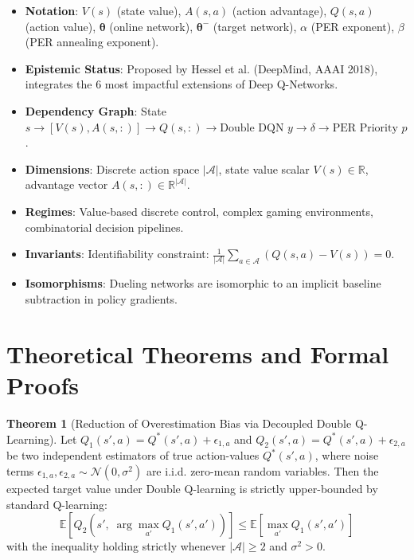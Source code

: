 \documentclass[11pt,a4paper]{article}
\theoremstyle{definition}
\newtheorem{theorem}{\textbf{Theorem}}[section]
\begin{document}
\begin{itemize}
    \item \textbf{Notation}: $V(s)$ (state value), $A(s, a)$ (action advantage), $Q(s, a)$ (action value), $\boldsymbol{\theta}$ (online network), $\boldsymbol{\theta}^-$ (target network), $\alpha$ (PER exponent), $\beta$ (PER annealing exponent).
    \item \textbf{Epistemic Status}: Proposed by Hessel et al. (DeepMind, AAAI 2018), integrates the 6 most impactful extensions of Deep Q-Networks.
    \item \textbf{Dependency Graph}: State $s \to [V(s), A(s, :)] \to Q(s, :) \to \text{Double DQN } y \to \delta \to \text{PER Priority } p$.
    \item \textbf{Dimensions}: Discrete action space $|\mathcal{A}|$, state value scalar $V(s) \in \mathbb{R}$, advantage vector $A(s, :) \in \mathbb{R}^{|\mathcal{A}|}$.
    \item \textbf{Regimes}: Value-based discrete control, complex gaming environments, combinatorial decision pipelines.
    \item \textbf{Invariants}: Identifiability constraint: $\frac{1}{|\mathcal{A}|}\sum_{a \in \mathcal{A}} (Q(s, a) - V(s)) = 0$.
    \item \textbf{Isomorphisms}: Dueling networks are isomorphic to an implicit baseline subtraction in policy gradients.
\end{itemize}

\section{Theoretical Theorems and Formal Proofs}

\begin{theorem}[Reduction of Overestimation Bias via Decoupled Double Q-Learning]
Let $Q_1(s', a) = Q^*(s', a) + \epsilon_{1, a}$ and $Q_2(s', a) = Q^*(s', a) + \epsilon_{2, a}$ be two independent estimators of true action-values $Q^*(s', a)$, where noise terms $\epsilon_{1, a}, \epsilon_{2, a} \sim \mathcal{N}(0, \sigma^2)$ are i.i.d. zero-mean random variables. Then the expected target value under Double Q-learning is strictly upper-bounded by standard Q-learning:
{\boldmath
\begin{equation}
\mathbb{E}\left[ Q_2\left( s', \; \arg\max_{a'} Q_1(s', a') \right) \right] \le \mathbb{E}\left[ \max_{a'} Q_1(s', a') \right]
\end{equation}
}
with the inequality holding strictly whenever $|\mathcal{A}| \ge 2$ and $\sigma^2 > 0$.
\end{theorem}
\end{document}
